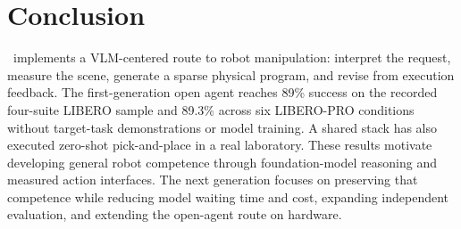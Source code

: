 \section{Conclusion}

\zyra\ implements a VLM-centered route to robot manipulation: interpret the request, measure the scene, generate a sparse physical program, and revise from execution feedback. The first-generation open agent reaches 89\% success on the recorded four-suite LIBERO sample and 89.3\% across six LIBERO-PRO conditions without target-task demonstrations or model training. A shared stack has also executed zero-shot pick-and-place in a real laboratory. These results motivate developing general robot competence through foundation-model reasoning and measured action interfaces. The next generation focuses on preserving that competence while reducing model waiting time and cost, expanding independent evaluation, and extending the open-agent route on hardware.
